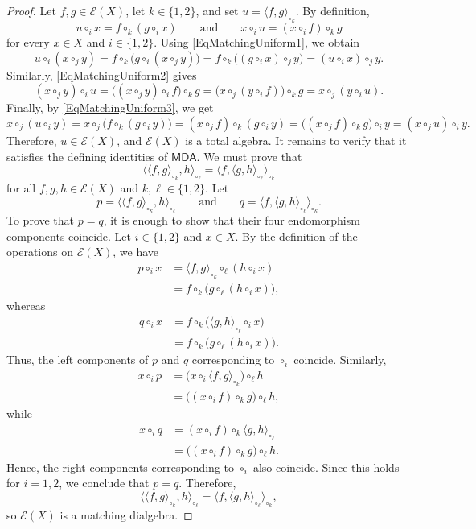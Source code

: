 \documentclass[reqno,a4paper]{amsart}
\theoremstyle{plain}
\theoremstyle{definition}
\theoremstyle{remark}
\numberwithin{equation}{section}
\newcommand{\E}{\mathcal{E}}
\newcommand{\Match}{\ensuremath{\mathsf{MDA}}}
\begin{document}
\begin{proof}
Let $f,g\in\E(X)$, let $k\in\{1,2\}$, and set $u=\langle f,g\rangle_{\circ_k}$. By definition,
\[
u\circ_i x=f\circ_k(g\circ_i x)
\qquad\text{and}\qquad
x\circ_i u=(x\circ_i f)\circ_k g
\]
for every $x\in X$ and $i\in\{1,2\}$. Using \eqref{EqMatchingUniform1}, we obtain
\[
u\circ_i(x\circ_j y)
=f\circ_k\bigl(g\circ_i(x\circ_j y)\bigr)
=f\circ_k\bigl((g\circ_i x)\circ_j y\bigr)
=(u\circ_i x)\circ_j y.
\]
Similarly, \eqref{EqMatchingUniform2} gives
\[
(x\circ_j y)\circ_i u
=\bigl((x\circ_j y)\circ_i f\bigr)\circ_k g
=\bigl(x\circ_j(y\circ_i f)\bigr)\circ_k g
=x\circ_j(y\circ_i u).
\]
Finally, by \eqref{EqMatchingUniform3}, we get
\[
x\circ_j(u \circ_i y)
=x\circ_j\bigl(f\circ_k(g\circ_i y)\bigr)
=(x\circ_j f)\circ_k(g\circ_i y)
=\bigl((x\circ_j f)\circ_k g\bigr)\circ_i y
=(x\circ_j u)\circ_i y.
\]
Therefore, $u \in\E(X)$, and $\E(X)$ is a total algebra. It remains to verify that it satisfies the defining identities of $\Match$. We must prove that
\[
\langle\langle f,g\rangle_{\circ_k},h\rangle_{\circ_\ell}
=
\langle f,\langle g,h\rangle_{\circ_\ell}\rangle_{\circ_k}
\]
for all $f,g,h\in\E(X)$ and $k,\ell\in\{1,2\}$. Let
\[
p=\langle\langle f,g\rangle_{\circ_k},h\rangle_{\circ_\ell}
\qquad\text{and}\qquad
q=\langle f,\langle g,h\rangle_{\circ_\ell}\rangle_{\circ_k}.
\]
To prove that $p=q$, it is enough to show that their four endomorphism components coincide. Let $i\in\{1,2\}$ and $x\in X$. By the definition of the operations on $\E(X)$, we have
\begin{align*}
p\circ_i x
&=\langle f,g\rangle_{\circ_k}\circ_\ell(h\circ_i x)\\
&=f\circ_k\bigl(g\circ_\ell(h\circ_i x)\bigr),
\end{align*}
whereas
\begin{align*}
q\circ_i x
&=f\circ_k\bigl(\langle g,h\rangle_{\circ_\ell}\circ_i x\bigr)\\
&=f\circ_k\bigl(g\circ_\ell(h\circ_i x)\bigr).
\end{align*}
Thus, the left components of $p$ and $q$ corresponding to $\circ_i$ coincide. Similarly,
\begin{align*}
x\circ_i p
&=\bigl(x\circ_i\langle f,g\rangle_{\circ_k}\bigr)\circ_\ell h\\
&=\bigl((x\circ_i f)\circ_k g\bigr)\circ_\ell h,
\end{align*}
while
\begin{align*}
x\circ_i q
&=(x\circ_i f)\circ_k\langle g,h\rangle_{\circ_\ell}\\
&=\bigl((x\circ_i f)\circ_k g\bigr)\circ_\ell h.
\end{align*}
Hence, the right components corresponding to $\circ_i$ also coincide. Since this holds for $i=1,2$, we conclude that $p=q$. Therefore,
\[
\langle\langle f,g\rangle_{\circ_k},h\rangle_{\circ_\ell}
=
\langle f,\langle g,h\rangle_{\circ_\ell}\rangle_{\circ_k},
\]
so $\E(X)$ is a matching dialgebra.
\end{proof}
\end{document}

